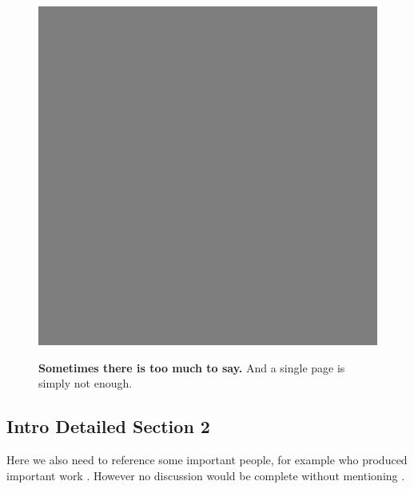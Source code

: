 \documentclass[pdftex, a4paper, oneside, 12pt, bibtotoc, idxtotoc ]{scrreprt}
\begin{document}
\begin{figure}[p]
  \captionsetup{labelformat=empty,list=no}
  \includegraphics[width=1.0\textwidth,height=1.0\textheight]{dummy.png}
  \caption{}
\end{figure}
\begin{figure}
  \captionsetup{labelformat=adja-page}
  \ContinuedFloat
  \caption[Sometimes there is too much to say]
  {\textbf{Sometimes there is too much to say.}
  And a single page is simply not enough.
  \blindtext[2]
  }
  \label{fig:a_large_figure}
\end{figure}

\subsection{Intro Detailed Section 2}
\blindtext[2]

Here we also need to reference some important people, for example \textcite{aksin} who produced
important work \cite{herrmann}.
However no discussion would be complete without mentioning \textcite{bertram}.

%
%
%
%
\end{document}
